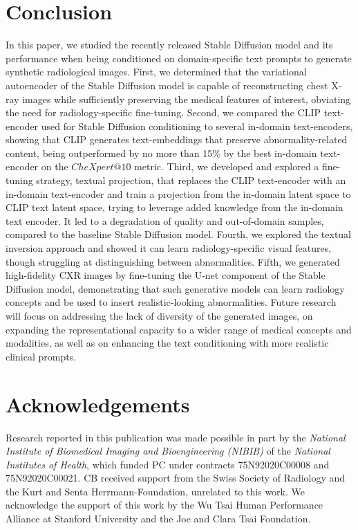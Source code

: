 \documentclass{article}
\begin{document}
\section{Conclusion}

In this paper, we studied the recently released Stable Diffusion model and its performance when being conditioned on domain-specific text prompts to generate synthetic radiological images. First, we determined that the variational autoencoder of the Stable Diffusion model is capable of reconstructing chest X-ray images while sufficiently preserving the medical features of interest, obviating the need for radiology-specific fine-tuning. Second, we compared the CLIP text-encoder used for Stable Diffusion conditioning to several in-domain text-encoders, showing that CLIP generates text-embeddings that preserve abnormality-related content, being outperformed by no more than 15\% by the best in-domain text-encoder on the $CheXpert@10$ metric. Third, we developed and explored a fine-tuning strategy, textual projection, that replaces the CLIP text-encoder with an in-domain text-encoder and train a projection from the in-domain latent space to CLIP text latent space, trying to leverage added knowledge from the in-domain text encoder. It led to a degradation of quality and out-of-domain samples, compared to the baseline Stable Diffusion model. Fourth, we explored the textual inversion approach and showed it can learn radiology-specific visual features, though struggling at distinguishing between abnormalities. Fifth, we generated high-fidelity CXR images by fine-tuning the U-net component of the Stable Diffusion model, demonstrating that such generative models can learn radiology concepts and be used to insert realistic-looking abnormalities. Future research will focus on addressing the lack of diversity of the generated images, on expanding the representational capacity to a wider range of medical concepts and modalities, as well as on enhancing the text conditioning with more realistic clinical prompts.  

\section{Acknowledgements}

Research reported in this publication was made possible in part by the \textit{National Institute of Biomedical Imaging and Bioengineering (NIBIB)} of the \textit{National Institutes of Health}, which funded PC under contracts
75N92020C00008 and 75N92020C00021. CB received support from the Swiss Society of Radiology and the Kurt and Senta Herrmann-Foundation, unrelated to this work. We acknowledge the support of this work by the Wu Tsai Human Performance Alliance at Stanford University and the Joe and Clara Tsai Foundation.
\end{document}
